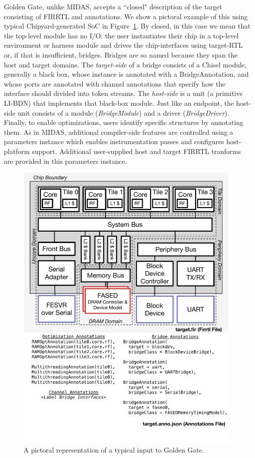 Golden Gate, unlike MIDAS, accepts a ``closed" description of the target
consisting of FIRRTL and annotations. We show a pictoral example of this using
typical Chipyard-generated SoC in Figure~\ref{fig:gg-target}. By closed, in
this case we mean that the top-level module has no I/O: the user instantiates their chip in a top-level
environment or harness module and drives the chip-interfaces using target-RTL
or, if that is insufficient, bridges. Bridges are so named because they span
the host and target domains. The \emph{target-side} of a bridge consists of a
Chisel module, generally a black box, whose instance is annotated with a BridgeAnnotation,
and whose ports are annotated with channel annotations that specify how the
interface should divided into token streams. The \emph{host-side} is a unit (a
primitive LI-BDN) that implements that black-box module. Just like an endpoint,
the host-side unit consists of a module (\emph{BridgeModule}) and a driver
(\emph{BridgeDriver}). Finally, to enable optimizations, users
identify specific structures by annotating them. As in MIDAS, additional compiler-side features are controlled using a
parameters instance which enables instrumentation passes and configures host-platform support.
Additional user-supplied host and target FIRRTL tranforms are provided in this parameters instance.

\begin{figure}
    \centering
    \includegraphics[width=0.99\textwidth]{figures/gg-target.pdf}
    \caption{A pictoral representation of a typical input to Golden Gate.}
    \label{fig:gg-target}
\end{figure}


